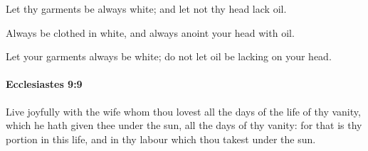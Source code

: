 			\begin{versebox}
					\item[BHS] 
					\item[LXX] 
					\item[ASV] Let thy garments be always white; and let not thy head lack oil.
					\item[NIV] Always be clothed in white, and always anoint your head with oil.
					\item[NRSV] Let your garments always be white; do not let oil be lacking on your head.
			\end{versebox}

		\paragraph{Ecclesiastes 9:9} %
			\label{ECCLESIASTES-9-9}

			Live joyfully with the wife whom thou lovest all the days of the life of thy vanity, which he hath given thee under the sun, all the days of thy vanity: for that is thy portion in this life, and in thy labour which thou takest under the sun.

